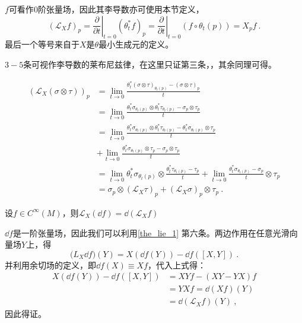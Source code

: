$f$可看作$0$阶张量场，因此其李导数亦可使用本节定义，
\begin{equation}
\left(\mathcal{L}_X f\right)_p=\left.\frac{\partial}{\partial t}\right|_{t=0}\left(\theta_t^* f\right)_p=\left.\frac{\partial}{\partial t}\right|_{t=0}(f\circ\theta_t(p))=X_pf~.
\end{equation}
最后一个等号来自于$X$是$\theta$最小生成元的定义。

$3-5$条可视作李导数的莱布尼兹律，在这里只证第三条，，其余同理可得。

\begin{equation}\begin{aligned}
(\mathcal{L}_X(\sigma\otimes\tau))_p& =\lim_{t\to0}\frac{\theta_t^*(\sigma\otimes\tau)_{\theta_t(p)}-(\sigma\otimes\tau)_p}t \\
&=\lim_{t\to0}\frac{\theta_t^*\sigma_{\theta_t(p)}\otimes\theta_t^*\tau_{\theta_t(p)}-\sigma_p\otimes\tau_p}t \\
&=\lim_{t\to0}\frac{\theta_t^*\sigma_{\theta_t(p)}\otimes\theta_t^*\tau_{\theta_t(p)}-\theta_t^*\sigma_{\theta_t(p)}\otimes\tau_p}t \\
&+\lim_{t\to0}\frac{\theta_t^*\sigma_{\theta_t(p)}\otimes\tau_p-\sigma_p\otimes\tau_p}t \\
&=\lim_{t\to0}\theta_t^*\sigma_{\theta_t(p)}\otimes\frac{\theta_t^*\tau_{\theta_t(p)}-\tau_p}t+\lim_{t\to0}\frac{\theta_t^*\sigma_{\theta_t(p)}-\sigma_p}t\otimes\tau_p \\
&=\sigma_{p}\otimes(\mathcal{L}_{X}\tau)_{p}+(\mathcal{L}_{X}\sigma)_{p}\otimes\tau_{p}~.
\end{aligned}\end{equation}
\begin{theorem}{}
设$f \in C^{\infty}(M)$，则$ \mathcal{L}_X(\dd f)=\dd(\mathcal{L} _X f)$
\end{theorem}
$\dd f$是一阶张量场，因此我们可以利用\autoref{the_lie_1} 第六条。两边作用在任意光滑向量场$Y$上，得
\begin{equation}
\mathcal (L_X\dd f)(Y)=X(\dd f(Y))-\dd f([X,Y])~.
\end{equation}
并利用余切场的定义，即$\dd f(X)\equiv Xf$，代入上式得：
\begin{equation}
\begin{aligned}
X(\dd f(Y))-\dd f([X,Y])&=XYf-(XY-YX)f\\
&=YXf=\dd(Xf)(Y)\\
&=\dd(\mathcal L_Xf)(Y)~,
\end{aligned}
\end{equation}
因此得证。

